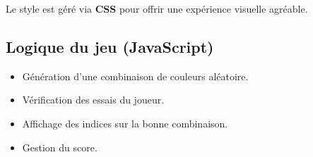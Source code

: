 \documentclass[a4paper,12pt]{article}
\begin{document}
Le style est géré via \textbf{CSS} pour offrir une expérience visuelle agréable.

\subsection{Logique du jeu (JavaScript)}
\begin{itemize}
    \item Génération d’une combinaison de couleurs aléatoire.
    \item Vérification des essais du joueur.
    \item Affichage des indices sur la bonne combinaison.
    \item Gestion du score.
\end{itemize}
\end{document}
